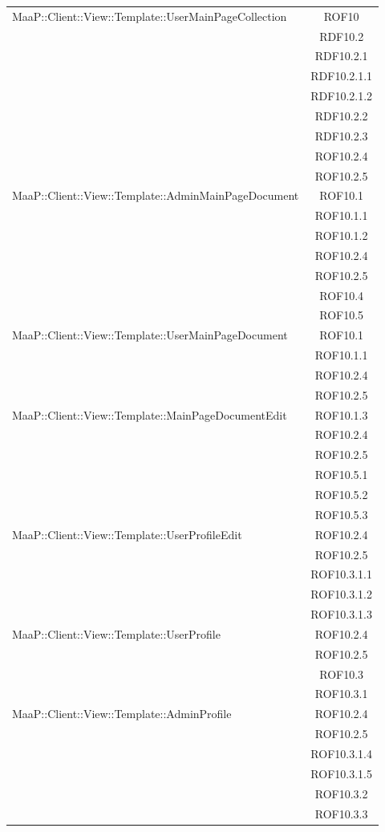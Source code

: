 \begin{center}
\begin{longtable}{|p{0.8\linewidth}|c|}
\midrule 
MaaP::Client::View::Template::UserMainPageCollection
& ROF10\\
& RDF10.2\\
& RDF10.2.1\\
& RDF10.2.1.1\\
& RDF10.2.1.2\\
& RDF10.2.2\\
& RDF10.2.3\\
& ROF10.2.4\\
& ROF10.2.5\\

\midrule 
MaaP::Client::View::Template::AdminMainPageDocument
& ROF10.1\\
& ROF10.1.1\\
& ROF10.1.2\\
& ROF10.2.4\\
& ROF10.2.5\\
& ROF10.4\\
& ROF10.5\\


\midrule 
MaaP::Client::View::Template::UserMainPageDocument
& ROF10.1\\
& ROF10.1.1\\
& ROF10.2.4\\
& ROF10.2.5\\


\midrule 
MaaP::Client::View::Template::MainPageDocumentEdit
& ROF10.1.3\\
& ROF10.2.4\\
& ROF10.2.5\\
& ROF10.5.1\\
& ROF10.5.2\\
& ROF10.5.3\\


\midrule 
MaaP::Client::View::Template::UserProfileEdit
& ROF10.2.4\\
& ROF10.2.5\\
& ROF10.3.1.1\\
& ROF10.3.1.2\\
& ROF10.3.1.3\\

\midrule 
MaaP::Client::View::Template::UserProfile
& ROF10.2.4\\
& ROF10.2.5\\
& ROF10.3\\
& ROF10.3.1\\

\midrule 
MaaP::Client::View::Template::AdminProfile
& ROF10.2.4\\
& ROF10.2.5\\
& ROF10.3.1.4\\
& ROF10.3.1.5\\
& ROF10.3.2\\
& ROF10.3.3\\



\end{longtable}
\end{center}

